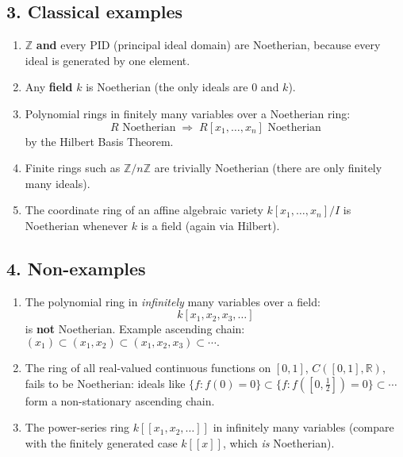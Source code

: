 \documentclass[12pt]{article}
\theoremstyle{definition} %
\theoremstyle{plain} %
\begin{document}
\subsection*{3.  Classical examples}

\begin{enumerate}
   \item \(\mathbb{Z}\) \textbf{and} every PID (principal ideal domain)
         are Noetherian, because every ideal is generated by one
         element.

   \item Any \textbf{field} \(k\) is Noetherian
         (the only ideals are \(0\) and \(k\)).

   \item Polynomial rings in finitely many variables over a Noetherian
         ring:
         \[
            R \text{ Noetherian}\;\Longrightarrow\;
            R[x_1,\dots,x_n] \text{ Noetherian}
         \]
         by the Hilbert Basis Theorem.

   \item Finite rings such as \(\mathbb{Z}/n\mathbb{Z}\) are trivially
         Noetherian (there are only finitely many ideals).

   \item The coordinate ring of an affine algebraic variety
         \(k[x_1,\dots,x_n]/I\) is Noetherian whenever \(k\) is a field
         (again via Hilbert).
\end{enumerate}

\subsection*{4.  Non-examples}

\begin{enumerate}
   \item The polynomial ring in \emph{infinitely} many variables over a
         field:
         \[
            k[x_1,x_2,x_3,\dots]
         \]
         is \textbf{not} Noetherian.  
         Example ascending chain:
         \(
            (x_1)\subset(x_1,x_2)\subset(x_1,x_2,x_3)\subset\cdots.
         \)

   \item The ring of all real-valued continuous functions on
         \([0,1]\), \(C([0,1],\mathbb{R})\), fails to be Noetherian:
         ideals like \(\{f: f(0)=0\}\subset\{f: f([0,\tfrac12])=0\}
         \subset\cdots\) form a non-stationary ascending chain.

   \item The power-series ring \(k[[x_1,x_2,\dots]]\) in infinitely many
         variables (compare with the finitely generated case
         \(k[[x]]\), which \emph{is} Noetherian).
\end{enumerate}
\end{document}
